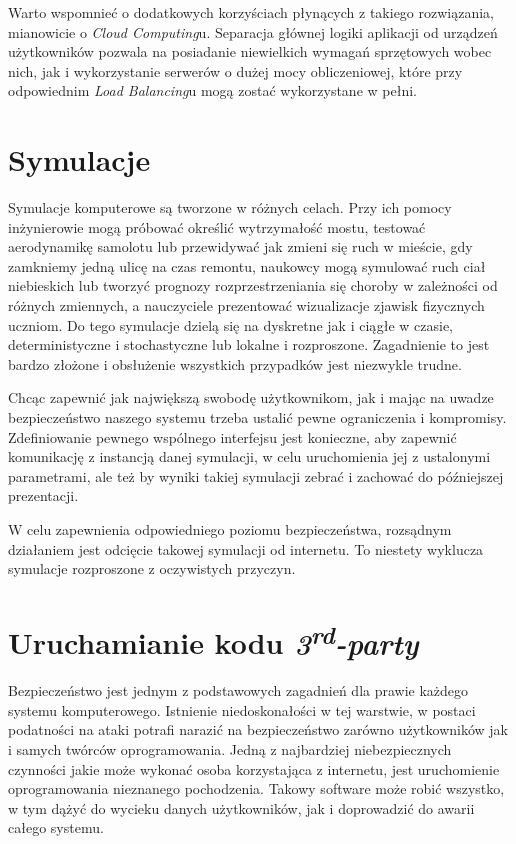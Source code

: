 \par Warto wspomnieć o dodatkowych korzyściach płynących z takiego rozwiązania, mianowicie o \emph{Cloud Computing}u. Separacja głównej logiki aplikacji od urządzeń użytkowników pozwala na posiadanie niewielkich wymagań sprzętowych wobec nich, jak i wykorzystanie serwerów o dużej mocy obliczeniowej, które przy odpowiednim \emph{Load Balancing}u mogą zostać wykorzystane w pełni.

\section{Symulacje}

\par Symulacje komputerowe są tworzone w różnych celach. Przy ich pomocy inżynierowie mogą próbować określić wytrzymałość mostu, testować aerodynamikę samolotu lub przewidywać jak zmieni się ruch w mieście, gdy zamkniemy jedną ulicę na czas remontu, naukowcy mogą symulować ruch ciał niebieskich lub tworzyć prognozy rozprzestrzeniania się choroby w zależności od różnych zmiennych, a nauczyciele prezentować wizualizacje zjawisk fizycznych uczniom. Do tego symulacje dzielą się na dyskretne jak i ciągłe w czasie, deterministyczne i stochastyczne\cite{mchaney1991computer} lub lokalne i rozproszone. Zagadnienie to jest bardzo złożone i obsłużenie wszystkich przypadków jest niezwykle trudne.

\par Chcąc zapewnić jak największą swobodę użytkownikom, jak i mając na uwadze bezpieczeństwo naszego systemu trzeba ustalić pewne ograniczenia i kompromisy. Zdefiniowanie pewnego wspólnego interfejsu jest konieczne, aby zapewnić komunikację z instancją danej symulacji, w celu uruchomienia jej z ustalonymi parametrami, ale też by wyniki takiej symulacji zebrać i zachować do późniejszej prezentacji.

\par W celu zapewnienia odpowiedniego poziomu bezpieczeństwa, rozsądnym działaniem jest odcięcie takowej symulacji od internetu. To niestety wyklucza symulacje rozproszone z oczywistych przyczyn.

\section{Uruchamianie kodu \emph{3\textsuperscript{rd}-party}}

\par Bezpieczeństwo jest jednym z podstawowych zagadnień dla prawie każdego systemu komputerowego. Istnienie niedoskonałości w tej warstwie, w postaci podatności na ataki potrafi narazić na bezpieczeństwo zarówno użytkowników jak i samych twórców oprogramowania. Jedną z najbardziej niebezpiecznych czynności jakie może wykonać osoba korzystająca z internetu, jest uruchomienie oprogramowania nieznanego pochodzenia. Takowy software może robić wszystko, w tym dążyć do wycieku danych użytkowników, jak i doprowadzić do awarii całego systemu.

